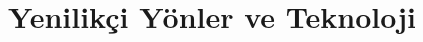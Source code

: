 \documentclass[aspectratio=169,xcolor={dvipsnames}]{beamer}
\begin{document}

\section{Yenilikçi Yönler ve Teknoloji}
\end{document}
